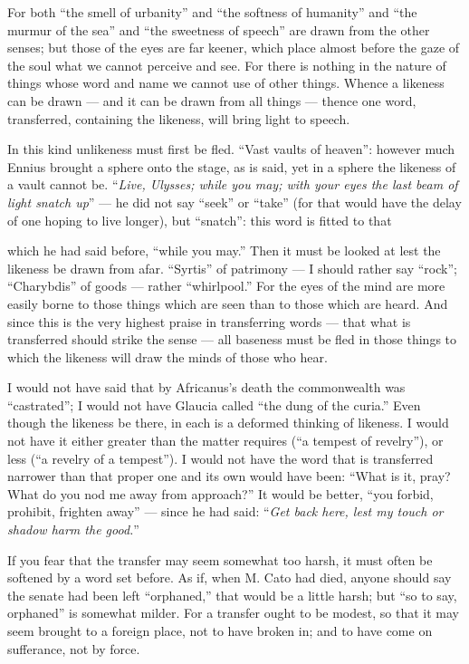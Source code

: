  For both ``the smell of urbanity'' and ``the softness of humanity'' and ``the murmur of the sea'' and ``the sweetness of speech'' are drawn from the other senses; but those of the eyes are far keener, which place almost before the gaze of the soul what we cannot perceive and see. For there is nothing in the nature of things whose word and name we cannot use of other things. Whence a likeness can be drawn — and it can be drawn from all things — thence one word, transferred, containing the likeness, will bring light to speech.

 In this kind unlikeness must first be fled. ``Vast vaults of heaven'': however much Ennius brought a sphere onto the stage, as is said, yet in a sphere the likeness of a vault cannot be. ``\textit{Live, Ulysses; while you may; with your eyes the last beam of light snatch up}'' — he did not say ``seek'' or ``take'' (for that would have the delay of one hoping to live longer), but ``snatch'': this word is fitted to that

 which he had said before, ``while you may.'' Then it must be looked at lest the likeness be drawn from afar. ``Syrtis'' of patrimony — I should rather say ``rock''; ``Charybdis'' of goods — rather ``whirlpool.'' For the eyes of the mind are more easily borne to those things which are seen than to those which are heard. And since this is the very highest praise in transferring words — that what is transferred should strike the sense — all baseness must be fled in those things to which the likeness will draw the minds of those who hear.

 I would not have said that by Africanus's death the commonwealth was ``castrated''; I would not have Glaucia called ``the dung of the curia.'' Even though the likeness be there, in each is a deformed thinking of likeness. I would not have it either greater than the matter requires (``a tempest of revelry''), or less (``a revelry of a tempest''). I would not have the word that is transferred narrower than that proper one and its own would have been: ``What is it, pray? What do you nod me away from approach?'' It would be better, ``you forbid, prohibit, frighten away'' — since he had said: ``\textit{Get back here, lest my touch or shadow harm the good.}''

 If you fear that the transfer may seem somewhat too harsh, it must often be softened by a word set before. As if, when M. Cato had died, anyone should say the senate had been left ``orphaned,'' that would be a little harsh; but ``so to say, orphaned'' is somewhat milder. For a transfer ought to be modest, so that it may seem brought to a foreign place, not to have broken in; and to have come on sufferance, not by force.

